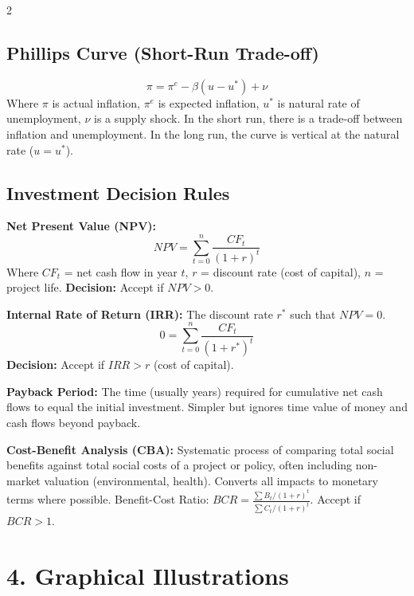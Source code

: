 \documentclass[10pt,a4paper]{article}
\begin{document}
\begin{multicols}{2}
\subsection*{Phillips Curve (Short-Run Trade-off)}
\[
\pi = \pi^e - \beta (u - u^*) + \nu
\]
Where $\pi$ is actual inflation, $\pi^e$ is expected inflation, $u^*$ is natural rate of unemployment, $\nu$ is a supply shock. In the short run, there is a trade-off between inflation and unemployment. In the long run, the curve is vertical at the natural rate ($u = u^*$).

\subsection*{Investment Decision Rules}
\textbf{Net Present Value (NPV):}
\[
NPV = \sum_{t=0}^{n} \frac{CF_t}{(1 + r)^t}
\]
Where $CF_t$ = net cash flow in year $t$, $r$ = discount rate (cost of capital), $n$ = project life. \textbf{Decision:} Accept if $NPV > 0$.

\textbf{Internal Rate of Return (IRR):} The discount rate $r^*$ such that $NPV = 0$.
\[
0 = \sum_{t=0}^{n} \frac{CF_t}{(1 + r^*)^t}
\]
\textbf{Decision:} Accept if $IRR > r$ (cost of capital).

\textbf{Payback Period:} The time (usually years) required for cumulative net cash flows to equal the initial investment. Simpler but ignores time value of money and cash flows beyond payback.

\textbf{Cost-Benefit Analysis (CBA):} Systematic process of comparing total social benefits against total social costs of a project or policy, often including non-market valuation (environmental, health). Converts all impacts to monetary terms where possible. Benefit-Cost Ratio: $BCR = \frac{\sum B_t/(1+r)^t}{\sum C_t/(1+r)^t}$. Accept if $BCR > 1$.

\section*{4. Graphical Illustrations}


\end{multicols}
\end{document}

